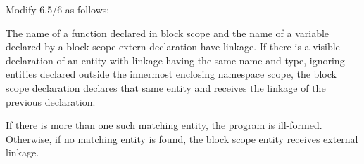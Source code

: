 \noindent
Modify 6.5/6 as follows:
\begin{std.txt}
\resetalinea[5]
\alinea
The name of a function declared in block scope and the name of a
variable declared by a block scope extern declaration have linkage. If
there is a visible declaration of an entity with linkage having the
same name and type, ignoring entities declared outside the innermost
enclosing namespace scope, the block scope declaration declares that
same entity and receives the linkage of the previous declaration. 
\begin{before}
\end{before}
If
there is more than one such matching entity, the program is
ill-formed. Otherwise, if no matching entity is found, the block scope
entity receives external linkage.
\begin{after}
\end{after}
\end{std.txt}

